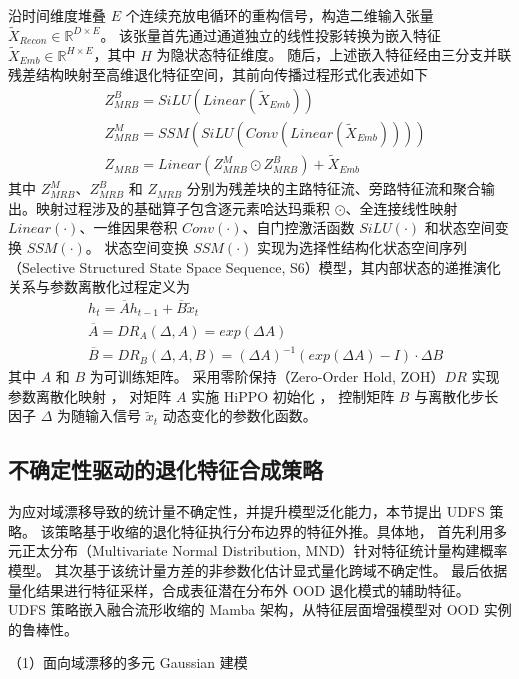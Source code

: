 沿时间维度堆叠 $E$ 个连续充放电循环的重构信号，构造二维输入张量 $\widetilde{X}_{Recon} \in \mathbb{R}^{D \times E}$。
该张量首先通过通道独立的线性投影转换为嵌入特征 $\widetilde{X}_{Emb} \in \mathbb{R}^{H \times E}$，其中 $H$ 为隐状态特征维度。
随后，上述嵌入特征经由三分支并联残差结构映射至高维退化特征空间，其前向传播过程形式化表述如下
% 
\begin{align}
& Z^{B}_{MRB} = SiLU(Linear(\widetilde{X}_{Emb})) \\
& Z^{M}_{MRB} = SSM(SiLU(Conv(Linear(\widetilde{X}_{Emb})))) \\
& Z_{MRB} = Linear(Z^{M}_{MRB} \odot Z^{B}_{MRB}) + \widetilde{X}_{Emb}
\end{align}
% 
其中 $Z^{M}_{MRB}$、$Z^{B}_{MRB}$ 和 $Z_{MRB}$ 分别为残差块的主路特征流、旁路特征流和聚合输出。映射过程涉及的基础算子包含逐元素哈达玛乘积 $\odot$、全连接线性映射 $Linear(\cdot)$、一维因果卷积 $Conv(\cdot)$、自门控激活函数 $SiLU(\cdot)$ 和状态空间变换 $SSM(\cdot)$。
% 
状态空间变换 $SSM(\cdot)$ 实现为选择性结构化状态空间序列（Selective Structured State Space Sequence, S6）模型，其内部状态的递推演化关系与参数离散化过程定义为
% 
\begin{align}
& h_{t} = \overline{A}h_{t-1} + \overline{B}\widetilde{x}_{t} \\
& \overline{A} = DR_{A}(\Delta, A) = exp(\Delta A) \\
& \overline{B} = DR_{B}(\Delta, A, B) = (\Delta A)^{-1}(exp(\Delta A)-I)\cdot\Delta B
\end{align}
% 
其中 $A$ 和 $B$ 为可训练矩阵。
采用零阶保持（Zero-Order Hold, ZOH）$DR$ 实现参数离散化映射 \cite{gu2024mamba}，
对矩阵 $A$ 实施 HiPPO 初始化 \cite{20212610553629}，
控制矩阵 $B$ 与离散化步长因子 $\Delta$ 为随输入信号 $\widetilde{x}_{t}$ 动态变化的参数化函数。

\subsection{不确定性驱动的退化特征合成策略}\label{subsec:UDFS}

为应对域漂移导致的统计量不确定性，并提升模型泛化能力，本节提出 UDFS 策略。
该策略基于收缩的退化特征执行分布边界的特征外推。具体地，
% 
首先利用多元正太分布（Multivariate Normal Distribution, MND）针对特征统计量构建概率模型。
其次基于该统计量方差的非参数化估计显式量化跨域不确定性。
最后依据量化结果进行特征采样，合成表征潜在分布外 OOD 退化模式的辅助特征。
UDFS 策略嵌入融合流形收缩的 Mamba 架构，从特征层面增强模型对 OOD 实例的鲁棒性。

（1）面向域漂移的多元 Gaussian 建模

